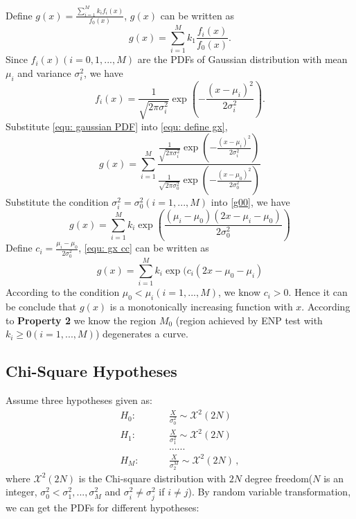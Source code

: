 \documentclass[12pt,journal,a4paper,twoside,doublecolumn]{IEEEtran}
\begin{document}
\begin{spacing}{1.0}
Define $g(x) = \frac{\sum_{i=1}^{M}k_if_i(x)}{f_0(x)}$, $g(x)$ can be written as 
\begin{equation}
\label{equ: define gx}
g(x) = \sum_{i=1}^{M}k_1\frac{f_i(x)}{f_0(x)}.
\end{equation}
Since $f_i(x) (i = 0, 1, ..., M)$ are the PDFs of Gaussian distribution with mean $\mu_i$ and variance $\sigma_i^2$, we have 
\begin{equation}
\label{equ: gaussian PDF}
f_i(x) = \frac{1}{\sqrt{2\pi\sigma_i^2}}\exp(-\frac{(x-\mu_i)^2}{2\sigma_i^2}).
\end{equation}
Substitute \eqref{equ: gaussian PDF} into \eqref{equ: define gx},
\begin{equation}
\label{g00}
g(x) = \sum_{i=1}^{M}\frac{\frac{1}{\sqrt{2\pi\sigma_i^2}}\exp(-\frac{(x-\mu_i)^2}{2\sigma_i^2})}{\frac{1}{\sqrt{2\pi\sigma_0^2}}\exp(-\frac{(x-\mu_0)^2}{2\sigma_0^2})}
\end{equation}
Substitute the condition $\sigma_i^2 = \sigma_0^2 (i = 1, ..., M)$ into \eqref{g00}, we have 
\begin{equation}
\label{equ: gx cc}
g(x) = \sum_{i=1}^{M}k_i\exp(\frac{(\mu_i - \mu_0)(2x-\mu_i - \mu_0)}{2\sigma_0^2})
\end{equation}
Define $c_i = \frac{\mu_i - \mu_0}{2\sigma_0^2}$, \eqref{equ: gx cc} can be written as
\begin{equation}
g(x) = \sum_{i=1}^{M}k_i\exp(c_i(2x-\mu_0 - \mu_i)
\end{equation}
According to the condition $\mu_0 < \mu_i (i=1, ..., M)$, we know $c_i >0$. Hence it can be conclude that $g(x)$ is a monotonically increasing function with $x$. According to \textbf{Property 2} we know the region $M_0$ (region achieved by ENP test with $k_i \geq 0 (i=1, ..., M)$) degenerates a curve.

\subsection{Chi-Square Hypotheses}
Assume three hypotheses  given as:
\begin{equation}
  \label{equ: Chisquare Hypothesis}
  \begin{split}
    H_0:\;\;\;\;\;\;\;\;&\frac{X}{\sigma_0^2} \sim \mathcal{X}^2(2N)\\
    H_1:\;\;\;\;\;\;\;\;&\frac{X}{\sigma_1^2} \sim \mathcal{X}^2(2N)\\
    &......\\
    H_M:\;\;\;\;\;\;\;\;&\frac{X}{\sigma_2^M} \sim \mathcal{X}^2(2N)\,,
  \end{split}
\end{equation}
where $\mathcal{X}^2(2N)$ is the Chi-square distribution with  $2N$ degree freedom($N$ is an integer, $\sigma_0^2 < \sigma_1^2, ..., \sigma_M^2$ and $\sigma_i^2 \neq \sigma_j^2$ if $i \neq j$). By random variable transformation\cite{mark2011probability}, we can get the PDFs for different hypotheses:


\end{spacing}
\end{document}
